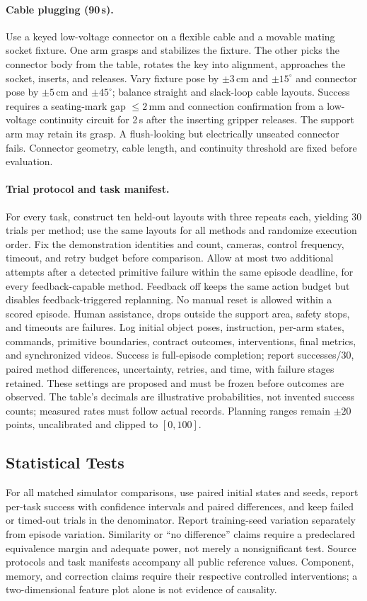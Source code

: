 \paragraph{Cable plugging (90\,s).}
Use a keyed low-voltage connector on a flexible cable and a movable mating socket fixture. One arm grasps and stabilizes the fixture. The other picks the connector body from the table, rotates the key into alignment, approaches the socket, inserts, and releases. Vary fixture pose by $\pm3$\,cm and $\pm15^\circ$ and connector pose by $\pm5$\,cm and $\pm45^\circ$; balance straight and slack-loop cable layouts. Success requires a seating-mark gap $\leq2$\,mm and connection confirmation from a low-voltage continuity circuit for 2\,s after the inserting gripper releases. The support arm may retain its grasp. A flush-looking but electrically unseated connector fails. Connector geometry, cable length, and continuity threshold are fixed before evaluation.

\paragraph{Trial protocol and task manifest.}
For every task, construct ten held-out layouts with three repeats each, yielding 30 trials per method; use the same layouts for all methods and randomize execution order. Fix the demonstration identities and count, cameras, control frequency, timeout, and retry budget before comparison. Allow at most two additional attempts after a detected primitive failure within the same episode deadline, for every feedback-capable method. Feedback off keeps the same action budget but disables feedback-triggered replanning. No manual reset is allowed within a scored episode. Human assistance, drops outside the support area, safety stops, and timeouts are failures. Log initial object poses, instruction, per-arm states, commands, primitive boundaries, contract outcomes, interventions, final metrics, and synchronized videos. Success is full-episode completion; report successes/30, paired method differences, uncertainty, retries, and time, with failure stages retained. These settings are proposed and must be frozen before outcomes are observed. The table's decimals are illustrative probabilities, not invented success counts; measured rates must follow actual records. Planning ranges remain $\pm20$ points, uncalibrated and clipped to $[0,100]$.

\subsection{Statistical Tests}

For all matched simulator comparisons, use paired initial states and seeds,
report per-task success with confidence intervals and paired differences, and
keep failed or timed-out trials in the denominator. Report training-seed
variation separately from episode variation. Similarity or ``no difference''
claims require a predeclared equivalence margin and adequate power, not merely
a nonsignificant test. Source protocols and task manifests accompany all public
reference values. Component, memory, and correction claims require their
respective controlled interventions; a two-dimensional feature plot alone is
not evidence of causality.

